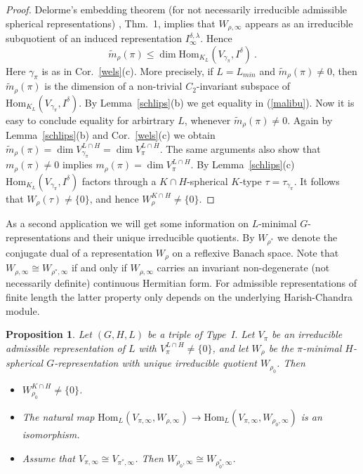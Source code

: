 \documentclass[10]{amsart}
\newtheorem{pro}[thm]{Proposition}
\theoremstyle{remark}
\theoremstyle{definition}
\numberwithin{equation}{section}
\newcommand{\Hom}{\mathrm{Hom}}
\newcommand{\be}{\begin{equation}}
\begin{document}
{\begin{proof}  Delorme's embedding theorem (for not necessarily irreducible admissible spherical representations) \cite{Del85}, Thm.~1, implies that $W_{\rho,\infty}$ appears as an irreducible subquotient of an induced representation
$I^{\delta,\lambda}_\infty$. Hence 
\be\label{malibu}
\widetilde m_\rho(\pi)\le\dim\Hom_{K_L}(V_{\gamma_\pi}, I^\delta)\ . 
\end{equation}
Here $\gamma_\pi$ is  as in Cor.~\ref{wels}(c). More precisely, if $L=L_{min}$ and $\widetilde m_\rho(\pi)\ne 0$, then $\widetilde m_\rho(\pi)$ is the dimension of a non-trivial $C_2$-invariant subspace of $\Hom_{K_L}(V_{\gamma_\pi}, I^\delta)$. By Lemma~\ref{schlips}(b)
we get equality in (\ref{malibu}). Now it is easy to conclude equality for arbirtrary $L$, whenever $\widetilde m_\rho(\pi)\ne 0$. Again by  Lemma~\ref{schlips}(b) and Cor.~\ref{wels}(c)
we obtain $\widetilde m_\rho(\pi)=\dim V_{\gamma_\pi}^{L\cap H}=\dim V_\pi^{L\cap H}$. The same arguments also show that $m_\rho(\pi)\ne 0$ implies 
$m_\rho(\pi)=\dim V_\pi^{L\cap H}$. By Lemma~\ref{schlips}(c) $\Hom_{K_L}(V_{\gamma_\pi}, I^\delta)$ factors through a $K\cap H$-spherical $K$-type $\tau=\tau_{\gamma_\pi}$.
It follows that $W_\rho(\tau)\ne\{0\}$, and hence $W_\rho^{K\cap H}\ne\{0\}$.
\end{proof}

As a second application we will get some information on $L$-minimal $G$-representations and their unique irreducible quotients.
By $W_{\rho^*}$ we denote the conjugate dual of a representation $W_\rho$ on a reflexive Banach space. Note that $W_{\rho,\infty}\cong W_{\rho^*,\infty}$ if and only if $W_{\rho,\infty}$ carries an invariant non-degenerate
(not necessarily definite) continuous Hermitian form. For admissible representations of finite length the latter property only depends on the underlying Harish-Chandra module.

\begin{pro}\label{dark}
Let $(G,H,L)$ be a triple of Type~I. Let $V_\pi$ be an irreducible admissible representation of $L$ with $V_\pi^{L\cap H}\ne\{0\}$, and let $W_\rho$ be the $\pi$-minimal $H$-spherical 
$G$-representation with unique irreducible quotient $W_{\rho_0}$. Then 
\begin{itemize}
\item[(i)]$W_{\rho_0}^{K\cap H}\ne\{0\}$.
\item[(ii)] The natural map $\Hom_L(V_{\pi,\infty},W_{\rho,\infty})\rightarrow \Hom_L(V_{\pi,\infty},W_{\rho_0,\infty})$ is an isomorphism.
\item[(iii)] Assume that $V_{\pi,\infty}\cong V_{\pi^*,\infty}$. Then $W_{\rho_0,\infty}\cong W_{\rho_0^*,\infty}$.
\end{itemize}
\end{pro}

}
\end{document}
